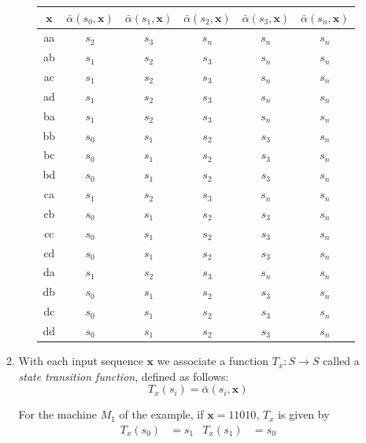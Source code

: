 \documentclass[twoside]{amsart}
\begin{document}
\begin{enumerate}[A.]
\begin{enumerate}[1]
\begin{enumerate}[(a)]
         \begin{center}
	 \begin{tabular}{c|ccccc}
	    $\mathbf{x}$ & $\bar{\alpha}(s_0,\mathbf{x})$
	       & $\bar{\alpha}(s_1,\mathbf{x})$
	       & $\bar{\alpha}(s_2,\mathbf{x})$
               & $\bar{\alpha}(s_3,\mathbf{x})$
               & $\bar{\alpha}(s_n,\mathbf{x})$\\ \hline
	              aa & $s_2$ & $s_3$ & $s_n$ & $s_n$ & $s_n$ \\
	              ab & $s_1$ & $s_2$ & $s_3$ & $s_n$ & $s_n$ \\
	              ac & $s_1$ & $s_2$ & $s_3$ & $s_n$ & $s_n$ \\
	              ad & $s_1$ & $s_2$ & $s_3$ & $s_n$ & $s_n$ \\
	              ba & $s_1$ & $s_2$ & $s_3$ & $s_n$ & $s_n$ \\
	              bb & $s_0$ & $s_1$ & $s_2$ & $s_3$ & $s_n$ \\
	              bc & $s_0$ & $s_1$ & $s_2$ & $s_3$ & $s_n$ \\
	              bd & $s_0$ & $s_1$ & $s_2$ & $s_3$ & $s_n$ \\
	              ca & $s_1$ & $s_2$ & $s_3$ & $s_n$ & $s_n$ \\
	              cb & $s_0$ & $s_1$ & $s_2$ & $s_3$ & $s_n$ \\
	              cc & $s_0$ & $s_1$ & $s_2$ & $s_3$ & $s_n$ \\
	              cd & $s_0$ & $s_1$ & $s_2$ & $s_3$ & $s_n$ \\
		      da & $s_1$ & $s_2$ & $s_3$ & $s_n$ & $s_n$ \\
		      db & $s_0$ & $s_1$ & $s_2$ & $s_3$ & $s_n$ \\
		      dc & $s_0$ & $s_1$ & $s_2$ & $s_3$ & $s_n$ \\
		      dd & $s_0$ & $s_1$ & $s_2$ & $s_3$ & $s_n$ 
	 \end{tabular}
	 \end{center}

      \end{enumerate}

      \item With each input sequence $\mathbf{x}$ we associate a function 
      $T_x : S \to S$ called a \emph{state transition function}, defined
      as follows:
      \[
         T_x(s_i) = \bar{\alpha}(s_i,\mathbf{x})
      \]

      \noindent For the machine $M_1$ of the example, if $\mathbf{x}=11010$,
      $T_x$ is given by
      \begin{align*}
         T_x(s_0) &= s_1   &   T_x(s_1) &= s_0 
      \end{align*}


\end{enumerate}
\end{enumerate}
\end{document}
